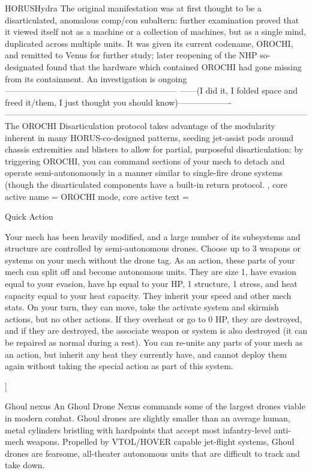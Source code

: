 \begin{mech}{HORUS}{Hydra}
{The original manifestation was at first thought to be a disarticulated, anomalous comp/con subaltern: further examination proved that it viewed itself not as a machine or a collection of machines, but as a single mind, duplicated across multiple units. It was given its current codename, OROCHI, and remitted to Venus for further study; later reopening of the NHP so-designated found that the hardware which contained OROCHI had gone missing from its containment. An investigation is ongoing--------------------------------------------------------------
------(I did it, I folded space and freed it/them, I just thought you should know)-------------------
------------------------------------------------------------------------------------------------------------
The OROCHI Disarticulation protocol takes advantage of the modularity inherent in many HORUS-co-designed patterns, seeding jet-assist pods around chassis extremities and blisters to allow for partial, purposeful disarticulation: by triggering OROCHI, you can command sections of your mech to detach and operate semi-autonomously in a manner similar to single-fire drone systems (though the disarticulated components have a built-in return protocol.
},
core active name = OROCHI mode,
core active text = {Quick Action

Your mech has been heavily modified, and a large number of its subsystems and structure are controlled by semi-autonomous drones. Choose up to 3 weapons or systems on your mech without the drone tag. As an action, these parts of your mech can split off and become autonomous units. They are size 1, have evasion equal to your evasion, have hp equal to your HP, 1 structure, 1 stress, and heat capacity equal to your heat capacity. They inherit your speed and other mech stats. On your turn, they can move, take the activate system and skirmish actions, but no other actions. If they overheat or go to 0 HP, they are destroyed, and if they are destroyed, the associate weapon or system is also destroyed (it can be repaired as normal during a rest). You can re-unite any parts of your mech as an action, but inherit any heat they currently have, and cannot deploy them again without taking the special action as part of this system.
}]


Ghoul nexus
An Ghoul Drone Nexus commands some of the largest drones viable in modern combat. Ghoul drones are slightly smaller than an average human, metal cylinders bristling with hardpoints that accept most infantry-level anti-mech weapons. Propelled by VTOL/HOVER capable jet-flight systems, Ghoul drones are fearsome, all-theater autonomous units that are difficult to track and take down.


\end{mech}
